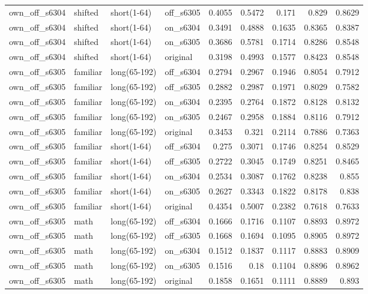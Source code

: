 \begin{table}
\begin{tabular}{llllrrrrr}
own\_off\_s6304 & shifted & short(1-64) & off\_s6305 & 0.4055 & 0.5472 & 0.171 & 0.829 & 0.8629 \\
own\_off\_s6304 & shifted & short(1-64) & on\_s6304 & 0.3491 & 0.4888 & 0.1635 & 0.8365 & 0.8387 \\
own\_off\_s6304 & shifted & short(1-64) & on\_s6305 & 0.3686 & 0.5781 & 0.1714 & 0.8286 & 0.8548 \\
own\_off\_s6304 & shifted & short(1-64) & original & 0.3198 & 0.4993 & 0.1577 & 0.8423 & 0.8548 \\
own\_off\_s6305 & familiar & long(65-192) & off\_s6304 & 0.2794 & 0.2967 & 0.1946 & 0.8054 & 0.7912 \\
own\_off\_s6305 & familiar & long(65-192) & off\_s6305 & 0.2882 & 0.2987 & 0.1971 & 0.8029 & 0.7582 \\
own\_off\_s6305 & familiar & long(65-192) & on\_s6304 & 0.2395 & 0.2764 & 0.1872 & 0.8128 & 0.8132 \\
own\_off\_s6305 & familiar & long(65-192) & on\_s6305 & 0.2467 & 0.2958 & 0.1884 & 0.8116 & 0.7912 \\
own\_off\_s6305 & familiar & long(65-192) & original & 0.3453 & 0.321 & 0.2114 & 0.7886 & 0.7363 \\
own\_off\_s6305 & familiar & short(1-64) & off\_s6304 & 0.275 & 0.3071 & 0.1746 & 0.8254 & 0.8529 \\
own\_off\_s6305 & familiar & short(1-64) & off\_s6305 & 0.2722 & 0.3045 & 0.1749 & 0.8251 & 0.8465 \\
own\_off\_s6305 & familiar & short(1-64) & on\_s6304 & 0.2534 & 0.3087 & 0.1762 & 0.8238 & 0.855 \\
own\_off\_s6305 & familiar & short(1-64) & on\_s6305 & 0.2627 & 0.3343 & 0.1822 & 0.8178 & 0.838 \\
own\_off\_s6305 & familiar & short(1-64) & original & 0.4354 & 0.5007 & 0.2382 & 0.7618 & 0.7633 \\
own\_off\_s6305 & math & long(65-192) & off\_s6304 & 0.1666 & 0.1716 & 0.1107 & 0.8893 & 0.8972 \\
own\_off\_s6305 & math & long(65-192) & off\_s6305 & 0.1668 & 0.1694 & 0.1095 & 0.8905 & 0.8972 \\
own\_off\_s6305 & math & long(65-192) & on\_s6304 & 0.1512 & 0.1837 & 0.1117 & 0.8883 & 0.8909 \\
own\_off\_s6305 & math & long(65-192) & on\_s6305 & 0.1516 & 0.18 & 0.1104 & 0.8896 & 0.8962 \\
own\_off\_s6305 & math & long(65-192) & original & 0.1858 & 0.1651 & 0.1111 & 0.8889 & 0.893 \\

\end{tabular}
\end{table}
